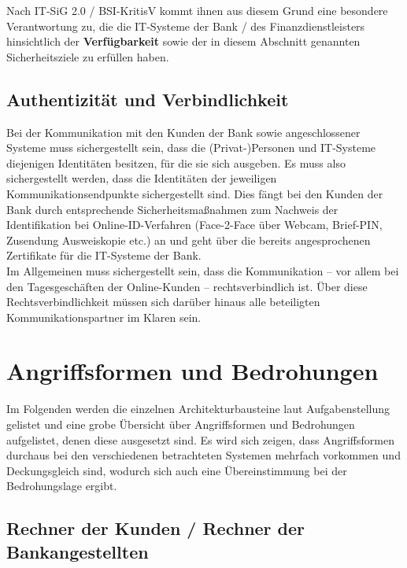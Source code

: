 \noindent
Nach IT-SiG 2.0 / BSI-KritisV kommt ihnen aus diesem Grund eine besondere Verantwortung zu, die die IT-Systeme der Bank / des Finanzdienstleisters hinsichtlich der \textbf{Verfügbarkeit} sowie der in diesem Abschnitt genannten Sicherheitsziele zu erfüllen haben.

\subsection{Authentizität und Verbindlichkeit}
Bei der Kommunikation mit den Kunden der Bank sowie angeschlossener Systeme muss sichergestellt sein, dass die (Privat-)Personen und IT-Systeme diejenigen Identitäten besitzen, für die sie sich ausgeben.
Es muss also sichergestellt werden, dass die Identitäten der jeweiligen Kommunikationsendpunkte sichergestellt sind.
Dies fängt bei den Kunden der Bank durch entsprechende Sicherheitsmaßnahmen zum Nachweis der Identifikation bei Online-ID-Verfahren (Face-2-Face über Webcam, Brief-PIN, Zusendung Ausweiskopie etc.) an und geht über die bereits angesprochenen Zertifikate für die IT-Systeme der Bank.\\
Im Allgemeinen muss sichergestellt sein, dass die Kommunikation – vor allem bei den Tagesgeschäften der Online-Kunden – rechtsverbindlich ist.
Über diese Rechtsverbindlichkeit müssen sich darüber hinaus alle beteiligten Kommunikationspartner im Klaren sein.

\section{Angriffsformen und Bedrohungen}

Im Folgenden werden die einzelnen Architekturbausteine laut Aufgabenstellung gelistet und eine grobe Übersicht über Angriffsformen und Bedrohungen aufgelistet, denen diese ausgesetzt sind.
Es wird sich zeigen, dass Angriffsformen durchaus bei den verschiedenen betrachteten Systemen mehrfach vorkommen und Deckungsgleich sind, wodurch sich auch eine Übereinstimmung bei der Bedrohungslage ergibt.

\subsection{Rechner der Kunden / Rechner der Bankangestellten}

